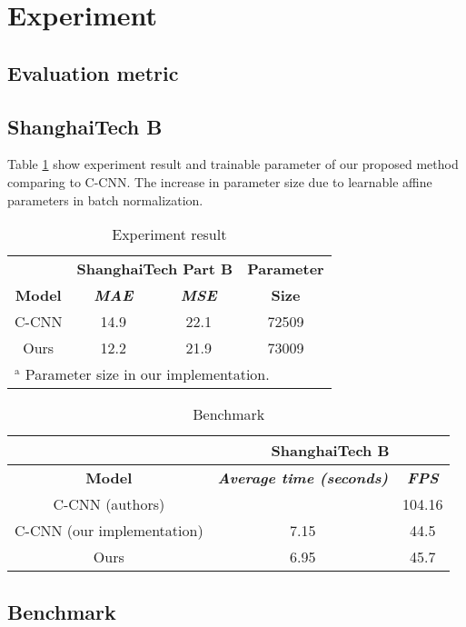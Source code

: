 \section{Experiment}

\subsection{Evaluation metric}


\subsection{ShanghaiTech B}

Table \ref{tab:experiment-result} show experiment result and trainable parameter of our proposed method comparing to C-CNN. The increase in parameter size due to learnable affine parameters in batch normalization.  

\begin{table}[htbp]
\caption{\label{tab:experiment-result}  Experiment result}
\begin{center}
\begin{tabular}{|c|c|c|c|}
\hline
\textbf{}&\multicolumn{2}{|c|}{\textbf{ShanghaiTech Part B}}&\textbf{Parameter} \\
\cline{1-3}
\textbf{Model} & \textbf{\textit{MAE}}& \textbf{\textit{MSE}}&\textbf{Size} \\
\hline
C-CNN & 14.9 & 22.1 & 72509   \\
\hline
Ours & 12.2 & 21.9 & 73009 \\
\hline
\multicolumn{4}{l}{$^{\mathrm{a}}$ Parameter size in our implementation.}
\end{tabular}

\end{center}
\end{table}


\begin{table}[htbp]
\caption{\label{tab:benchmark}  Benchmark}
\begin{center}
\begin{tabular}{|c|c|c|}
\hline
\textbf{}&\multicolumn{2}{|c|}{\textbf{ShanghaiTech B}} \\
\hline
\textbf{Model} & \textbf{\textit{Average time (seconds)}}& \textbf{\textit{FPS}} \\
\hline
C-CNN (authors) &   & 104.16    \\
\hline
C-CNN (our implementation) & 7.15 &  44.5    \\
\hline
Ours & 6.95 & 45.7 \\
\hline
\end{tabular}

\end{center}
\end{table}

\subsection{Benchmark}

